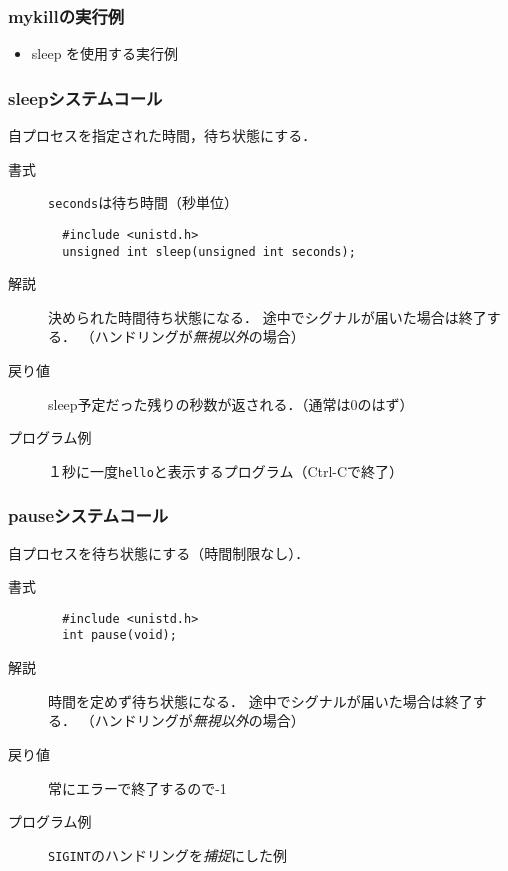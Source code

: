 \documentclass{beamer}                 %
\begin{document}
\begin{frame}[fragile]
  \frametitle{mykillの実行例}
  \begin{quote}
  \end{quote}

  \begin{itemize}
  \item sleep を使用する実行例
  \end{itemize}
\end{frame}

\begin{frame}[fragile]
  \frametitle{sleepシステムコール}
  自プロセスを指定された時間，待ち状態にする．

  \begin{description}
  \item[書式] \texttt{seconds}は待ち時間（秒単位）

\begin{verbatim}
  #include <unistd.h>
  unsigned int sleep(unsigned int seconds);
\end{verbatim}

  \item[解説]
    決められた時間待ち状態になる．
    途中でシグナルが届いた場合は終了する．
    （ハンドリングが\emph{無視以外}の場合）

  \item[戻り値]
    sleep予定だった残りの秒数が返される．（通常は0のはず）
  
  \item[プログラム例]
    １秒に一度\texttt{hello}と表示するプログラム（Ctrl-Cで終了）
  \end{description}
\end{frame}

\begin{frame}[fragile]
  \frametitle{pauseシステムコール}
  自プロセスを待ち状態にする（時間制限なし）．

  \begin{description}
  \item[書式]
\begin{verbatim}
  #include <unistd.h>
  int pause(void);
\end{verbatim}

  \item[解説]
    時間を定めず待ち状態になる．
    途中でシグナルが届いた場合は終了する．
    （ハンドリングが\emph{無視以外}の場合）

  \item[戻り値]
    常にエラーで終了するので-1
  
  \item[プログラム例] \texttt{SIGINT}のハンドリングを\emph{捕捉}にした例
  \end{description}
\end{frame}
\end{document}
